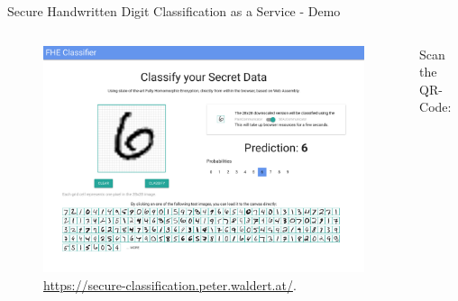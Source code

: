 \begin{frame}{Secure Handwritten Digit Classification as a Service - Demo}
  \begin{columns}[c]
    \begin{column}{0.7\linewidth}
      \begin{figure}[H]
        \centering
        \includegraphics[width=0.75\linewidth]{../thesis/figures/frontend.pdf}
        \vspace{-0.3cm}
        \caption{\url{https://secure-classification.peter.waldert.at/}.}
      \end{figure}
    \end{column}
    \begin{column}{0.24\linewidth}
      Scan the QR-Code:
    \end{column}
  \end{columns}
\end{frame}
